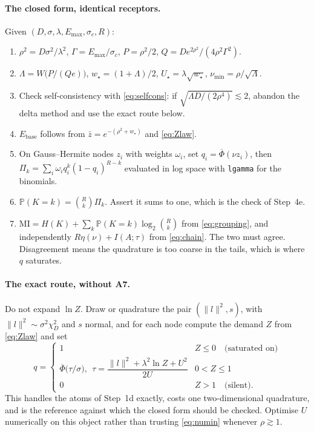 \documentclass[11pt,a4paper]{article}
\newcommand{\PP}{\mathbb{P}}
\newcommand{\Phibar}{\overline{\Phi}}
\newcommand{\Ebase}{E_{\mathrm{base}}}
\newcommand{\Emax}{E_{\mathrm{max}}}
\begin{document}
\paragraph{The closed form, identical receptors.} Given
$(D,\sigma,\lambda,\Emax,\sigma_c,R)$:
\begin{enumerate}
  \item $\rho^2=D\sigma^2/\lambda^2$, $\Gamma=\Emax/\sigma_c$,
        $P=\rho^2/2$, $Q=De^{2\rho^2}/(4\rho^2\Gamma^2)$.
  \item $\Lambda=W\big(P/(Qe)\big)$, $w_\star=(1+\Lambda)/2$,
        $U_\star=\lambda\sqrt{w_\star}$, $\nu_{\min}=\rho/\sqrt{\Lambda}$.
  \item Check self-consistency with \eqref{eq:selfcons}: if
        $\sqrt{\Lambda D/(2\rho^4)}\lesssim2$, abandon the delta method and use the exact
        route below.
  \item $\Ebase$ follows from $\bar z=e^{-(\rho^2+w_\star)}$ and \eqref{eq:Zlaw}.
  \item On Gauss--Hermite nodes $z_i$ with weights $\omega_i$, set
        $q_i=\Phibar(\nu z_i)$, then
        $\Pi_k=\sum_i\omega_i q_i^k(1-q_i)^{R-k}$ evaluated in log space with
        \texttt{lgamma} for the binomials.
  \item $\PP(K=k)=\binom{R}{k}\Pi_k$. Assert it sums to one, which is the check of
        Step~4e.
  \item $\mathrm{MI}=H(K)+\sum_k\PP(K=k)\log_2\binom{R}{k}$ from \eqref{eq:grouping},
        and independently $R\eta(\nu)+I(A;\tau)$ from \eqref{eq:chain}. The two must
        agree. Disagreement means the quadrature is too coarse in the tails, which is
        where $q$ saturates.
\end{enumerate}

\paragraph{The exact route, without A7.} Do not expand $\ln Z$. Draw or quadrature the
pair $(\|l\|^2,s)$, with $\|l\|^2\sim\sigma^2\chi^2_D$ and $s$ normal, and for each node
compute the demand $Z$ from \eqref{eq:Zlaw} and set
\begin{equation}
  q = \begin{cases}
    1 & Z\le0 \quad\text{(saturated on)}\\
    \Phibar\big(\tau/\sigma\big), \ \ \tau=\dfrac{\|l\|^2+\lambda^2\ln Z+U^2}{2U}
      & 0<Z\le1\\
    0 & Z>1 \quad\text{(silent)} .
  \end{cases}
\end{equation}
This handles the atoms of Step~1d exactly, costs one two-dimensional quadrature, and is
the reference against which the closed form should be checked. Optimise $U$ numerically
on this object rather than trusting \eqref{eq:numin} whenever $\rho\gtrsim1$.
\end{document}
